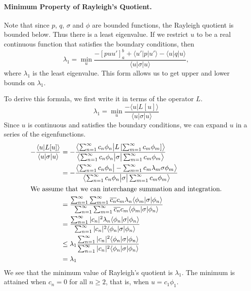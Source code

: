 \paragraph{Minimum Property of Rayleigh's Quotient.}
Note that since $p$, $q$, $\sigma$ and $\phi$ are bounded functions,
the Rayleigh quotient is bounded below.  Thus there is a least eigenvalue.
If we restrict $u$ to be a real continuous function that satisfies the 
boundary conditions, then
\[ 
\lambda_1 = \min_u \frac{-[p u u']_a^b + \langle u' | p | u' \rangle - \langle u | q | u \rangle}{\langle u | \sigma | u \rangle},
\]
where $\lambda_1$ is the least eigenvalue.
This form allows us to get upper and lower bounds on $\lambda_1$.  

To derive this formula, we first write it in terms of the operator $L$.
\[ 
\lambda_1 = \min_u \frac{-\langle u | L[u] \rangle}{\langle u | \sigma | u \rangle}
\]
Since $u$ is continuous and satisfies the boundary conditions, we can 
expand $u$ in a series of the eigenfunctions.
\begin{align*}
  -\frac{\langle u | L[u] \rangle}{\langle u | \sigma | u \rangle}
  &= - \frac{\left\langle \sum_{n = 1}^\infty c_n \phi_n \big| L \left[ 
        \sum_{m = 1}^\infty c_m \phi_m \right] \right\rangle}
  {\left\langle \sum_{n = 1}^\infty c_n \phi_n \big| \sigma \big|
      \sum_{m = 1}^\infty c_m \phi_m \right\rangle} 
  \\
  &= - \frac{\left\langle \sum_{n = 1}^\infty c_n \phi_n \big|  
      -\sum_{m = 1}^\infty c_m \lambda_m \sigma \phi_m \right\rangle}
  {\left\langle \sum_{n = 1}^\infty c_n \phi_n \big| \sigma \big|
      \sum_{m = 1}^\infty c_m \phi_m \right\rangle} 
  \\
  \intertext{We assume that we can interchange summation and integration.}
  &= \frac{ \sum_{n = 1}^\infty \sum_{m = 1}^\infty \overline{c_n} c_m \lambda_n \langle \phi_m | \sigma | \phi_n \rangle}
  {\sum_{n = 1}^\infty \sum_{m = 1}^\infty \overline{c_n} c_m \langle \phi_m | \sigma | \phi_n \rangle} 
  \\
  &= \frac{\sum_{n = 1}^\infty |c_n|^2 \lambda_n \langle \phi_n | \sigma | \phi_n \rangle}
  {\sum_{n = 1}^\infty |c_n|^2 \langle \phi_n | \sigma | \phi_n \rangle} 
  \\
  &\leq \lambda_1 \frac{\sum_{n = 1}^\infty |c_n|^2 \langle \phi_n | \sigma | \phi_n \rangle}
  {\sum_{n = 1}^\infty |c_n|^2 \langle \phi_n | \sigma | \phi_n \rangle} 
  \\
  &= \lambda_1
\end{align*}
We see that the minimum value of Rayleigh's quotient is $\lambda_1$.  The minimum
is attained when $c_n = 0$ for all $n \geq 2$, that is, when $u = c_1 \phi_1$.








